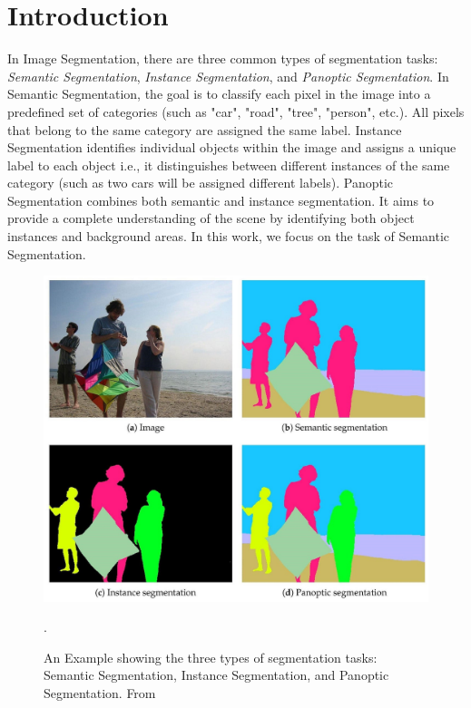 \section{Introduction}
\label{sec:intro}

In Image Segmentation, there are three common types of segmentation tasks: \textit{Semantic Segmentation}, \textit{Instance Segmentation}, and \textit{Panoptic Segmentation}. In Semantic Segmentation, the goal is to classify each pixel in the image into a predefined set of categories (such as "car", "road", "tree", "person", etc.). All pixels that belong to the same category are assigned the same label. Instance Segmentation identifies individual objects within the image and assigns a unique label to each object i.e., it distinguishes between different instances of the same category (such as two cars will be assigned different labels). Panoptic Segmentation combines both semantic and instance segmentation. It aims to provide a complete understanding of the scene by identifying both object instances and background areas. In this work, we focus on the task of Semantic Segmentation.

\begin{figure}[t]
  \centering
   \includegraphics[width=0.8\linewidth]{images/image_seg_example.jpg}

   \caption{An Example showing the three types of segmentation tasks: Semantic Segmentation, Instance Segmentation, and Panoptic Segmentation. From ~\cite{medium_article_1}}.
   \label{fig:onecol}
\end{figure}
